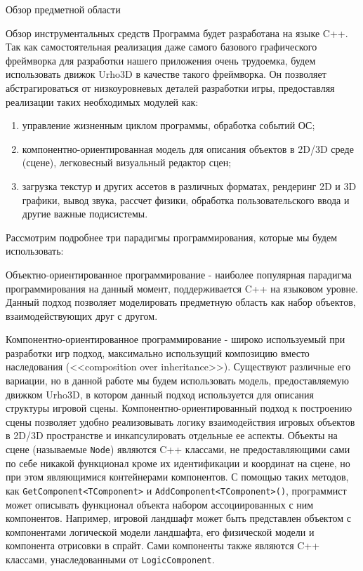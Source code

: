 \begin{section}{Обзор предметной области}
		\begin{subsection}{Обзор инструментальных средств}
			Программа будет разработана на языке C++.
			Так как самостоятельная реализация даже самого базового графического фреймворка для разработки нашего приложения очень трудоемка, будем использовать движок Urho3D в качестве такого фреймворка.
			Он позволяет абстрагироваться от низкоуровневых деталей разработки игры, предоставляя реализации таких необходимых модулей как:
			\begin{enumerate}
				\item управление жизненным циклом программы, обработка событий ОС;
				\item компонентно-ориентированная модель для описания объектов в 2D/3D среде (сцене), легковесный визуальный редактор сцен;
				\item загрузка текстур и других ассетов в различных форматах, рендеринг 2D и 3D графики, вывод звука, рассчет физики, обработка пользовательского ввода и другие важные подисистемы.
			\end{enumerate}

			Рассмотрим подробнее три парадигмы программирования, которые мы будем использовать:

			Объектно-ориентированное программирование - наиболее популярная парадигма программирования на данный момент, поддерживается C++ на языковом уровне.
			Данный подход позволяет моделировать предметную область как набор объектов, взаимодействующих друг с другом.

			Компонентно-ориентированное программирование - широко используемый при разработки игр подход, максимально использущий композицию вместо наследования (<<composition over inheritance>>).
			Существуют различные его вариации, но в данной работе мы будем использовать модель, предоставляемую движком Urho3D, в котором данный подход используется для описания структуры игровой сцены.
			Компонентно-ориентированный подход к построению сцены позволяет удобно реализовывать логику взаимодействия игровых объектов в 2D/3D пространстве и инкапсулировать отдельные ее аспекты.
			Объекты на сцене (называемые \verb|Node|) являются C++ классами, не предоставляющими сами по себе никакой функционал кроме их идентификации и координат на сцене, но при этом являющимися контейнерами компонентов.
			С помощью таких методов, как \verb|GetComponent<TComponent>| и \verb|AddComponent<TComponent>()|, программист может описывать функционал объекта набором ассоциированных с ним компонентов.
			Например, игровой ландшафт может быть представлен объектом с компонентами логической модели ландшафта, его физической модели и компонента отрисовки в спрайт.
			Сами компоненты также являются C++ классами, унаследованными от \verb|LogicComponent|.


\end{subsection}
\end{section}
